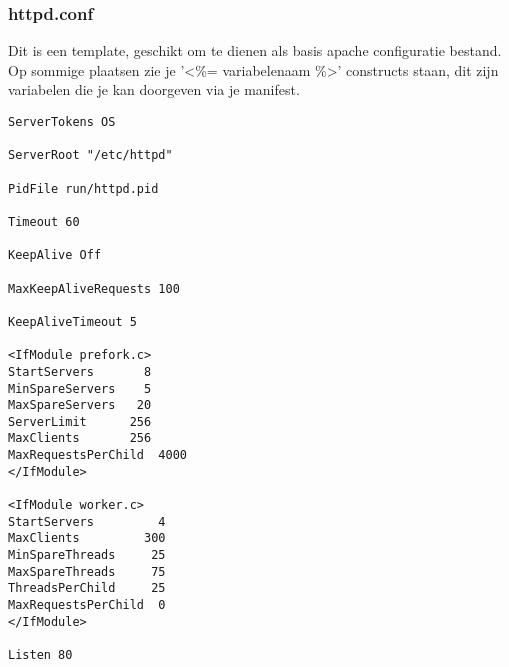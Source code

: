 \subsubsection{httpd.conf}
Dit is een template, geschikt om te dienen als basis apache configuratie bestand. Op sommige plaatsen zie je '<\%= variabelenaam \%>' constructs staan, dit zijn variabelen die je kan doorgeven via je manifest.
\begin{code}
\begin{lstlisting}
ServerTokens OS

ServerRoot "/etc/httpd"

PidFile run/httpd.pid

Timeout 60

KeepAlive Off

MaxKeepAliveRequests 100

KeepAliveTimeout 5

<IfModule prefork.c>
StartServers       8
MinSpareServers    5
MaxSpareServers   20
ServerLimit      256
MaxClients       256
MaxRequestsPerChild  4000
</IfModule>

<IfModule worker.c>
StartServers         4
MaxClients         300
MinSpareThreads     25
MaxSpareThreads     75 
ThreadsPerChild     25
MaxRequestsPerChild  0
</IfModule>

Listen 80


\end{lstlisting}
\end{code}
